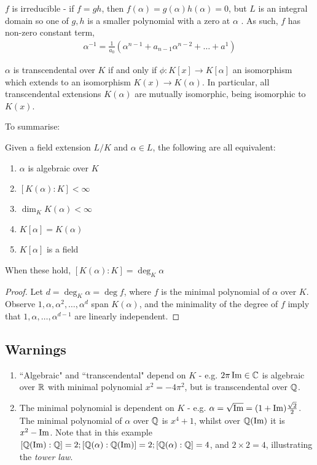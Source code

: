 \documentclass[a4paper, 10pt, twocolumn]{amsart}
\begin{document}
$f$ is irreducible - if $f = gh$, then $f(\alpha) = g(\alpha)h(\alpha) = 0$, but $L$ is an integral domain so one of $g, h$ is a smaller polynomial with a zero at $\alpha$ \contr. As such, $f$ has non-zero constant term, 
\begin{align*}
\alpha^{-1} = \frac{1}{a_0}\left(\alpha^{n-1}+a_{n-1}\alpha^{n-2}+\ldots+a^1\right)
\end{align*}
\begin{proposition}
$\alpha$ is transcendental over $K$ if and only if $\phi:K[x] \rightarrow K[\alpha]$ an isomorphism which extends to an isomorphism $K(x)\rightarrow K(\alpha)$. In particular, all transcendental extensions $K(\alpha)$ are mutually isomorphic, being isomorphic to $K(x)$.
\end{proposition}
To summarise:
\begin{proposition}
Given a field extension $L/K$ and $\alpha \in L$, the following are all equivalent:
\begin{enumerate}
\item $\alpha$ is algebraic over $K$
\item $[K(\alpha) : K] < \infty$
\item $\dim_K K(\alpha) < \infty$
\item $K[\alpha] = K(\alpha)$
\item $K[\alpha]$ is a field
\end{enumerate}
When these hold, $[K(\alpha) : K] = \deg_K \alpha$
\end{proposition}
\begin{proof}
Let $d = \deg_K \alpha = \deg f$, where $f$ is the minimal polynomial of $\alpha$ over $K$. Observe $1, \alpha, \alpha^2, \ldots, \alpha^d$ span $K(\alpha)$, and the minimality of the degree of $f$ imply that $1, \alpha, \ldots, \alpha^{d-1}$ are linearly independent.
\end{proof}

\subsection*{Warnings}
\begin{enumerate}
\item``Algebraic" and ``transcendental" depend on $K$ - e.g. $2\pi\operatorname{Im} \in \mathbb{C}$ is algebraic over $\mathbb{R}$ with minimal polynomial $x^2 = -4\pi^2$, but is transcendental over $\mathbb{Q}$.
\item The minimal polynomial is dependent on $K$ - e.g. $\alpha = \sqrt{\operatorname{Im}} = (1+\operatorname{Im})\frac{\sqrt{2}}{2}$. The minimal polynomial of $\alpha$ over $\mathbb{Q}$ is $x^4+1$, whilst over $\mathbb{Q}(\operatorname{Im})$ it is $x^2 - \operatorname{Im}$. Note that in this example $[\mathbb{Q}(\operatorname{Im}):\mathbb{Q}] = 2; [\mathbb{Q}(\alpha):\mathbb{Q}(\operatorname{Im})] = 2; [\mathbb{Q}(\alpha):\mathbb{Q}] = 4$, and $2\times 2=4$, illustrating the \emph{tower law}.
\end{enumerate}
\end{document}
